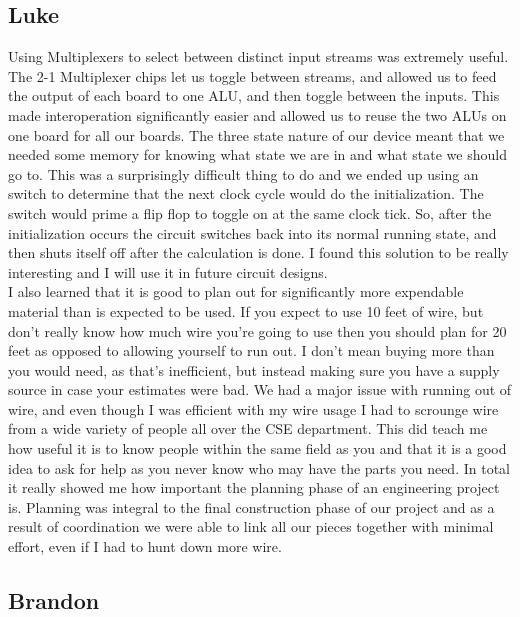 \subsection{Luke}
Using Multiplexers to select between distinct input streams was extremely useful. The 2-1 Multiplexer chips let us toggle between streams, and allowed us to feed the output of each board to one ALU, and then toggle between the inputs. This made interoperation significantly easier and allowed us to reuse the two ALUs on one board for all our boards. The three state nature of our device meant that we needed some memory for knowing what state we are in and what state we should go to. This was a surprisingly difficult thing to do and we ended up using an switch to determine that the next clock cycle would do the initialization. The switch would prime a flip flop to toggle on at the same clock tick. So, after the initialization occurs the circuit switches back into its normal running state, and then shuts itself off after the calculation is done. I found this solution to be really interesting and I will use it in future circuit designs.\\


I also learned that it is good to plan out for significantly more expendable material than is expected to be used. If you expect to use 10 feet of wire, but don't really know how much wire you're going to use then you should plan for 20 feet as opposed to allowing yourself to run out. I don't mean buying more than you would need, as that's inefficient, but instead making sure you have a supply source in case your estimates were bad. We had a major issue with running out of wire, and even though I was efficient with my wire usage I had to scrounge wire from a wide variety of people all over the CSE department. This did teach me how useful it is to know people within the same field as you and that it is a good idea to ask for help as you never know who may have the parts you need. In total it really showed me how important the planning phase of an engineering project is. Planning was integral to the final construction phase of our project and as a result of coordination we were able to link all our pieces together with minimal effort, even if I had to hunt down more wire.\\

 
\subsection{Brandon}
